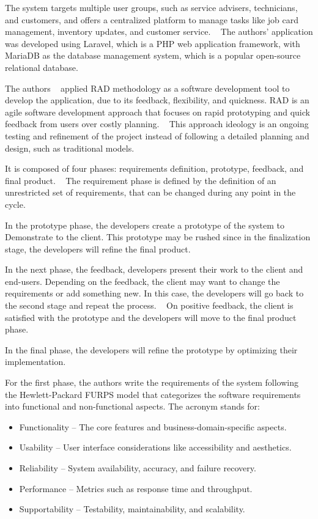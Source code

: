 The system targets multiple user groups, such as service advisers, technicians, and customers, and offers a centralized platform to manage tasks like job card management, inventory updates, and customer service. ~\cite{MAS_MOTORS}
The authors' application was developed using Laravel, which is a PHP web application framework, with MariaDB as the database management system, which is a popular open-source relational database.

The authors ~\citet{MAS_MOTORS} applied \ac{RAD} methodology as a software development tool to develop the application, due to its feedback, flexibility, and quickness.
\ac{RAD} is an agile software development approach that focuses on rapid prototyping and quick feedback from users over costly planning. ~\cite{rapid_app_development}
This approach ideology is an ongoing testing and refinement of the project instead of following a detailed planning and design, such as traditional models.

It is composed of four phases: requirements definition, prototype, feedback, and final product. ~\cite{rapid_app_development}
The requirement phase is defined by the definition of an unrestricted set of requirements, that can be changed during any point in the cycle. 

In the prototype phase, the developers create a prototype of the system to Demonstrate to the client. 
This prototype may be rushed since in the finalization stage, the developers will refine the final product. ~\cite{rapid_app_development}

In the next phase, the feedback, developers present their work to the client and end-users.
Depending on the feedback, the client may want to change the requirements or add something new. In this case, the developers will go back to the second stage and repeat the process. ~\cite{rapid_app_development}
On positive feedback, the client is satisfied with the prototype and the developers will move to the final product phase.

In the final phase, the developers will refine the prototype by optimizing their implementation. ~\cite{rapid_app_development}

For the first phase, the authors write the requirements of the system following the Hewlett-Packard \ac{FURPS} model that categorizes the software requirements into functional and non-functional aspects.
The acronym stands for:

\begin{itemize}
   \item Functionality – The core features and business-domain-specific aspects.
   \item Usability – User interface considerations like accessibility and aesthetics.
   \item Reliability – System availability, accuracy, and failure recovery.
   \item Performance – Metrics such as response time and throughput.
   \item Supportability – Testability, maintainability, and scalability.
  \end{itemize}

